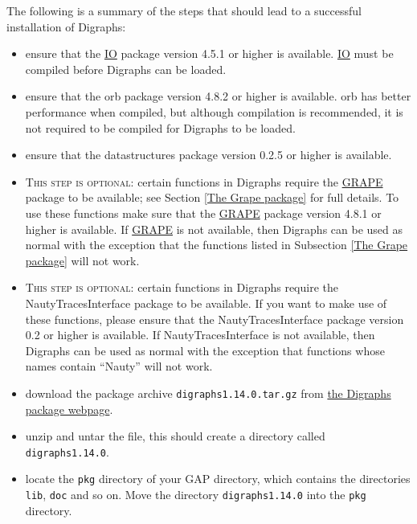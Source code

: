 \documentclass[a4paper,11pt]{report}
\begin{document}
{{ The following is a summary of the steps that should lead to a successful
installation of \textsf{Digraphs}: 
\begin{itemize}
\item  ensure that the \href{https://gap-packages.github.io/io} {IO}  package version 4.5.1 or higher is available. \href{https://gap-packages.github.io/io} {IO}  must be compiled before \textsf{Digraphs} can be loaded. 
\item  ensure that the \textsf{orb} package version 4.8.2 or higher is available. \textsf{orb} has better performance when compiled, but although compilation is recommended,
it is not required to be compiled for \textsf{Digraphs} to be loaded. 
\item  ensure that the \textsf{datastructures} package version 0.2.5 or higher is available. 
\item  \textsc{This step is optional:} certain functions in \textsf{Digraphs} require the \href{https://gap-packages.github.io/grape} {GRAPE}  package to be available; see Section \ref{The Grape package} for full details. To use these functions make sure that the \href{https://gap-packages.github.io/grape} {GRAPE}  package version 4.8.1 or higher is available. If \href{https://gap-packages.github.io/grape} {GRAPE}  is not available, then \textsf{Digraphs} can be used as normal with the exception that the functions listed in
Subsection \ref{The Grape package} will not work. 
\item  \textsc{This step is optional:} certain functions in \textsf{Digraphs} require the \textsf{NautyTracesInterface} package to be available.  If you want to make use of these functions, please ensure that the \textsf{NautyTracesInterface} package version 0.2 or higher is available. If \textsf{NautyTracesInterface} is not available, then \textsf{Digraphs} can be used as normal with the exception that functions whose names contain ``Nauty'' will not work. 
\item  download the package archive \texttt{digraphs\texttt{}1.14.0.tar.gz} from \href{https://digraphs.github.io/Digraphs} {the Digraphs package webpage}. 
\item  unzip and untar the file, this should create a directory called \texttt{digraphs\texttt{}1.14.0}. 
\item  locate the \texttt{pkg} directory of your \textsf{GAP} directory, which contains the directories \texttt{lib}, \texttt{doc} and so on. Move the directory \texttt{digraphs\texttt{}1.14.0} into the \texttt{pkg} directory. 

\end{itemize}}}
\end{document}
